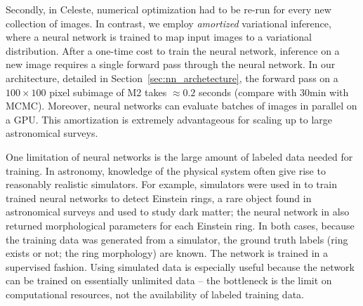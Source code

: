 Secondly, in Celeste, numerical optimization had to be re-run for every new collection of images. 
In contrast, we employ {\itshape amortized} variational inference, where a neural network is trained to map input images to a variational distribution. After a one-time cost to train the neural network, inference 
on a new image requires a single forward pass through the neural network. In our 
architecture, detailed in Section~\ref{sec:nn_archetecture}, the forward pass on 
a $100 \times 100$ pixel subimage of M2 takes $\approx 0.2$ seconds (compare with 30min with MCMC). Moreover, neural networks can evaluate batches of images in parallel on a GPU. This amortization is extremely advantageous for scaling up to large astronomical surveys.

One limitation of neural networks is the large amount of labeled data needed for training. 
In astronomy, knowledge of the physical system  often give rise to reasonably realistic simulators. 
For example, simulators were used in \cite{Lanusse_2017_cmudeeplens} to train trained neural networks to detect Einstein rings, 
a rare object found in astronomical surveys and used to study dark matter; the neural network in \cite{Hezaveh_2017_nn_lensing_nature} also returned
morphological parameters for each Einstein ring. 
In both cases, because the training data was generated from a simulator, the ground truth labels (ring exists or not; the ring morphology) are known. The network is trained in a supervised fashion. Using simulated data is especially useful because the network can be trained on essentially unlimited data -- the bottleneck is the limit on computational resources, not the availability of labeled training data. 

